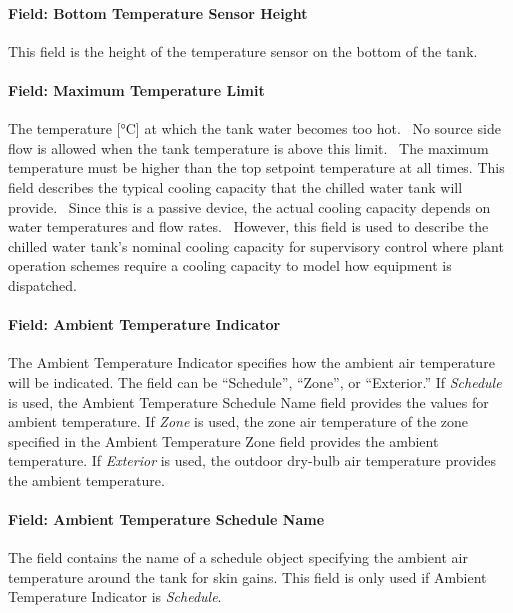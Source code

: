 \paragraph{Field: Bottom Temperature Sensor Height}\label{field-bottom-temperature-sensor-height-thermalstoragehotwaterstratified}
This field is the height of the temperature sensor on the bottom of the tank.
\paragraph{Field: Maximum Temperature Limit}\label{field-maximum-temperature-limit-thermalstoragehotwaterstratified}
The temperature {[}°C{]} at which the tank water becomes too hot.~ No source
side flow is allowed when the tank temperature is above this limit.~ The maximum
temperature must be higher than the top setpoint temperature at all times.
This field describes the typical cooling capacity that the chilled water tank will provide.~ Since this is a passive device, the actual cooling capacity depends on water temperatures and flow rates.~ However, this field is used to describe the chilled water tank's nominal cooling capacity for supervisory control where plant operation schemes require a cooling capacity to model how equipment is dispatched.

\paragraph{Field: Ambient Temperature
Indicator}\label{field-ambient-temperature-indicator-thermalstoragehotwaterstratified}

The Ambient Temperature Indicator specifies how the ambient air temperature will
be indicated. The field can be ``Schedule'', ``Zone'', or ``Exterior.'' If
\emph{Schedule} is used, the Ambient Temperature Schedule Name field provides
the values for ambient temperature. If \emph{Zone} is used, the zone air
temperature of the zone specified in the Ambient Temperature Zone field provides
the ambient temperature. If \emph{Exterior} is used, the outdoor dry-bulb air
temperature provides the ambient temperature.

\paragraph{Field: Ambient Temperature Schedule
Name}\label{field-ambient-temperature-schedule-name-thermalstoragehotwaterstratified}

The field contains the name of a schedule object specifying the ambient air
temperature around the tank for skin gains. This field is only used if Ambient
Temperature Indicator is \emph{Schedule}.

